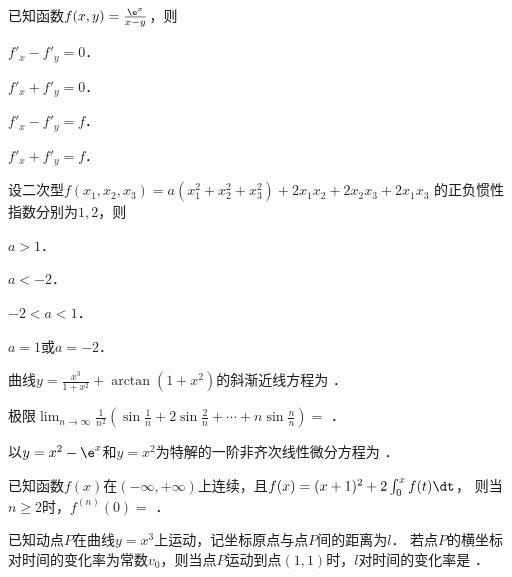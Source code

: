 \documentclass[plain,noanswer,medmath]{../../template/jnuexam}
\begin{document}
\begin{problem}
已知函数$f(x,y) = \frac{\e^x}{x - y}$，则\pickout{}
\begin{abcd}
\item $f'_x - f'_y = 0$．
\item $f'_x + f'_y = 0$．
\item $f'_x - f'_y = f$．
\item $f'_x + f'_y = f$．
\end{abcd}
\end{problem}




\begin{problem}
设二次型$f(x_1,x_2,x_3) = a(x_1^2 + x_2^2 + x_3^2) + 2x_1x_2 + 2x_2x_3 + 2x_1x_3$
的正负惯性指数分别为$1,2$，则\pickout{}
\begin{abcd}
\item $a > 1$．
\item $a < - 2$．
\item $- 2 < a < 1$．
\item $a = 1$或$a = - 2$．
\end{abcd}
\end{problem}




\begin{problem}
曲线$y = \frac{x^3}{1 + x^2} + \arctan(1 + x^2)$的斜渐近线方程为 \fillin{}．
\end{problem}


\begin{problem}
极限$\lim_{n \to \infty} \frac{1}{n^2}\left(\sin\frac{1}{n} + 2\sin\frac{2}{n}
+ \cdots + n\sin\frac{n}{n}\right) =$ \fillin{}．
\end{problem}


\begin{problem}
以$y = x^2 - \e^x$和$y = x^2$为特解的一阶非齐次线性微分方程为 \fillin{}．
\end{problem}


\begin{problem}
已知函数$f(x)$在$(-\infty,+\infty)$上连续，且$f(x) = (x + 1)^2 + 2\int_0^x f(t) \dt$，
则当$n \ge 2$时，$f^{(n)}(0) =$ \fillin{}．
\end{problem}


\begin{problem}
已知动点$P$在曲线$y = x^3$上运动，记坐标原点与点$P$间的距离为$l$．
若点$P$的横坐标对时间的变化率为常数$v_0$，则当点$P$运动到点$(1,1)$时，$l$对时间的变化率是 \fillin{}．
\end{problem}
\end{document}
